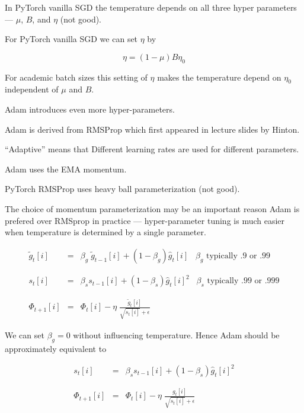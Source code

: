 {In PyTorch vanilla SGD the temperature depends on all three hyper parameters --- $\mu$,  $B$, and $\eta$ (not good).

For PyTorch vanilla SGD we can set $\eta$ by

\vfill
$$\eta = (1-\mu)B\eta_0$$

\vfill
For academic batch sizes this setting of $\eta$ makes the temperature depend on $\eta_0$ independent of $\mu$ and $B$.


Adam introduces even more hyper-parameters.

\vfill
Adam is derived from RMSProp which first appeared in lecture slides by Hinton.

\vfill
``Adaptive'' means that Different learning rates are used for different parameters.


Adam uses the EMA momentum.

\vfill
PyTorch RMSProp uses heavy ball parameterization (not good).

\vfill
The choice of momentum  parameterization may be an important reason Adam is prefered over RMSprop in practice --- hyper-parameter tuning
is much easier when temperature is determined by a single parameter.


\begin{eqnarray*}
{ \tilde{g}_t[i]} & { =} & \beta_g\;\tilde{g}_{t-1}[i] + (1-\beta_g)\hat{g}_t[i]\;\;\;\mbox{$\beta_g$ typically .9 or .99} \\
\\
\\
{ s_t[i]} & { =} & { \beta_s s_{t-1}[i] + (1-\beta_s)\hat{g}_t[i]^2}\;\;\;\mbox{$\beta_s$ typically .99 or .999} \\
\\
\\
{ \Phi_{t+1}[i]} & { =} & { \Phi_t[i] - \eta\;\frac{\tilde{g}_t[i]}{\sqrt{s_t[i]} + \epsilon}}
\end{eqnarray*}


We can set $\beta_g = 0$ without influencing temperature.  Hence Adam should be approximately equivalent to


\begin{eqnarray*}
{ s_t[i]} & { =} & { \beta_s s_{t-1}[i] + (1-\beta_s)\hat{g}_t[i]^2} \\
\\
\\
{ \Phi_{t+1}[i]} & { =} & { \Phi_t[i] - \eta\;\frac{g_t[i]}{\sqrt{s_t[i]} + \epsilon}}
\end{eqnarray*}

}
